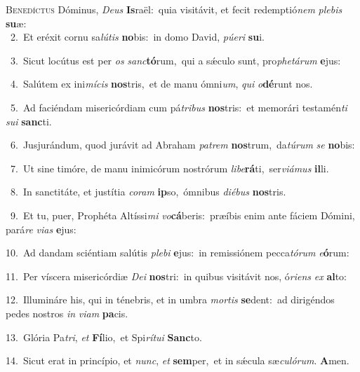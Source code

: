\lettrine{\initial\textcolor{\initialcolor}{B}}{enedíctus} Dóminus, \textit{De}\-\textit{us} \textbf{Is}\-raël:~\star quia visitávit, et fecit redemptió\textit{nem} \textit{ple}\-\textit{bis} \textbf{su}\-æ:\\
{\numbfont\textcolor{\numbcolor}{~2.}}~Et eréxit cornu sa\-\textit{lú}\-\textit{tis} \textbf{no}\-bis:~\star in domo David, \textit{pú}\-\textit{e}\textit{ri} \textbf{su}\-i.\par
{\numbfont\textcolor{\numbcolor}{~3.}}~Sicut locútus est per \textit{os} \textit{sanc}\-\textbf{tó}rum,~\star qui a sǽculo sunt, pro\-\textit{phe}\-\textit{tá}\textit{rum} \textbf{e}\-jus:\par
{\numbfont\textcolor{\numbcolor}{~4.}}~Salútem ex ini\-\textit{mí}\-\textit{cis} \textbf{nos}\-tris,~\star et de manu ómni\-\textit{um}\-, \textit{qui} \textit{o}\-\textbf{dé}runt nos.\par
{\numbfont\textcolor{\numbcolor}{~5.}}~Ad faciéndam misericórdiam cum pá\-\textit{tri}\-\textit{bus} \textbf{nos}\-tris:~\star et memorári testamén\textit{ti} \textit{su}\-\textit{i} \textbf{sanc}\-ti.\par
{\numbfont\textcolor{\numbcolor}{~6.}}~Jusjurándum, quod jurávit ad Abraham \textit{pa}\-\textit{trem} \textbf{nos}\-trum,~\star da\-\textit{tú}\-\textit{rum} \textit{se} \textbf{no}\-bis:\par
{\numbfont\textcolor{\numbcolor}{~7.}}~Ut sine timóre, de manu inimicórum nostrórum \textit{li}\-\textit{be}\textbf{rá}ti,~\star ser\-\textit{vi}\-\textit{á}\textit{mus} \textbf{il}\-li.\par
{\numbfont\textcolor{\numbcolor}{~8.}}~In sanctitáte, et justítia \textit{co}\-\textit{ram} \textbf{ip}\-so,~\star ómnibus \textit{di}\-\textit{é}\textit{bus} \textbf{nos}\-tris.\par
{\numbfont\textcolor{\numbcolor}{~9.}}~Et tu, puer, Prophéta Altíssi\textit{mi} \textit{vo}\-\textbf{cá}beris:~\star præíbis enim ante fáciem Dómini, pará\textit{re} \textit{vi}\-\textit{as} \textbf{e}\-jus:\par
{\numbfont\textcolor{\numbcolor}{10.}}~Ad dandam sciéntiam salútis \textit{ple}\-\textit{bi} \textbf{e}\-jus:~\star in remissiónem pecca\-\textit{tó}\-\textit{rum} \textit{e}\-\textbf{ó}rum:\par
{\numbfont\textcolor{\numbcolor}{11.}}~Per víscera misericórdiæ \textit{De}\-\textit{i} \textbf{nos}\-tri:~\star in quibus visitávit nos, ó\-\textit{ri}\-\textit{ens} \textit{ex} \textbf{al}\-to:\par
{\numbfont\textcolor{\numbcolor}{12.}}~Illumináre his, qui in ténebris, et in umbra \textit{mor}\-\textit{tis} \textbf{se}\-dent:~\star ad dirigéndos pedes nostros \textit{in} \textit{vi}\-\textit{am} \textbf{pa}\-cis.\par
{\numbfont\textcolor{\numbcolor}{13.}}~Glória Pa\-\textit{tri}\-, \textit{et} \textbf{Fí}\-lio,~\star et Spi\-\textit{rí}\-\textit{tu}\textit{i} \textbf{Sanc}\-to.\par
{\numbfont\textcolor{\numbcolor}{14.}}~Sicut erat in princípio, et \textit{nunc}\-, \textit{et} \textbf{sem}\-per,~\star et in sǽcula sæ\-\textit{cu}\-\textit{ló}\textit{rum}. \textbf{A}\-men.\par
